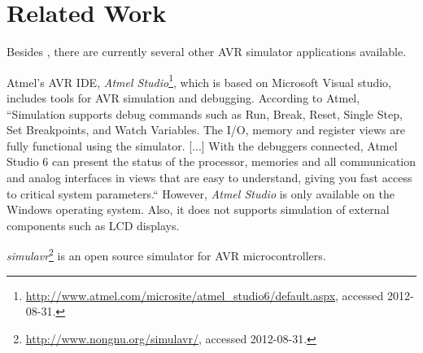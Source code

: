 
\chapter{Related Work} \label{chapter:relatedwork}

Besides \simavr, there are currently several other \ac{AVR} simulator
applications available.

Atmel's \ac{AVR} \ac{IDE}, \emph{Atmel Studio}\footnote{
%
\url{http://www.atmel.com/microsite/atmel_studio6/default.aspx}, accessed 2012-08-31.
%
}, which is based on Microsoft Visual studio, includes tools for \ac{AVR} simulation
and debugging. According to Atmel,
``Simulation supports debug commands such as Run, Break, Reset, Single Step,
Set Breakpoints, and Watch Variables. The I/O, memory and register views are
fully functional using the simulator. [...] With the debuggers connected, Atmel
Studio 6 can present the status of the processor, memories and all communication
and analog interfaces in views that are easy to understand, giving you fast
access to critical system parameters.`` \cite{atmel} However, \emph{Atmel Studio}
is only available on the Windows operating system. Also, it does not supports
simulation of external components such as \ac{LCD} displays.

\emph{simulavr}\footnote{
%
\url{http://www.nongnu.org/simulavr/}, accessed 2012-08-31.
%
} is an open source simulator for \ac{AVR} microcontrollers.

